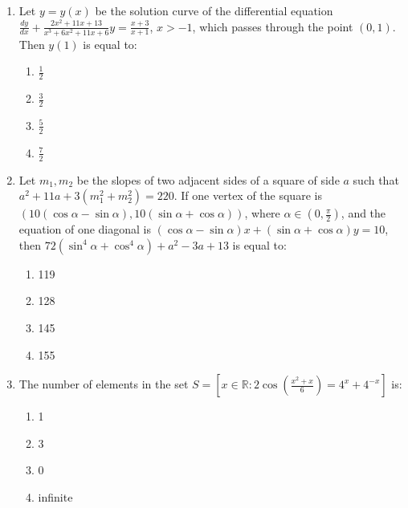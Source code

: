 \documentclass[journal]{IEEEtran}
\newcommand{\brak}[1]{\left( #1 \right)}
\newcommand{\sbrak}[1]{\left[ #1 \right]}
\newcommand{\gt}{>}
\begin{document}
\begin{enumerate}
    \item Let $y=y\brak{x}$ be the solution curve of the differential equation $\frac{dy}{dx}+\frac{2x^{2}+11x+13}{x^{3}+6x^{2}+11x+6}y=\frac{x+3}{x+1}$, $x\gt-1$, which passes through the point $\brak{0,1}$. Then $y\brak{1}$ is equal to:

        \begin{multicols}{4}
        \begin{enumerate}
        \item $\frac{1}{2}$
        \item $\frac{3}{2}$
        \item $\frac{5}{2}$
        \item $\frac{7}{2}$
        \end{enumerate}
        \end{multicols}

    \item Let $m_{1}, m_{2}$ be the slopes of two adjacent sides of a square of side $a$ such that $a^{2}+11a+3\brak{m_{1}^{2}+m_{2}^{2}}=220$. If one vertex of the square is $\brak{10\brak{\cos{\alpha}-\sin{\alpha}}, 10\brak{\sin{\alpha}+\cos{\alpha}}}$, where $\alpha\in\brak{0,\frac{\pi}{2}}$, and the equation of one diagonal is $\brak{\cos{\alpha}-\sin{\alpha}}x+\brak{\sin{\alpha}+\cos{\alpha}}y=10$, then $72\brak{\sin^{4}{\alpha}+\cos^{4}{\alpha}}+a^{2}-3a+13$ is equal to:

        \begin{multicols}{4}
        \begin{enumerate}
        \item 119
        \item 128
        \item 145
        \item 155
        \end{enumerate}
        \end{multicols}

    \item The number of elements in the set $S=\sbrak{x\in\mathbb{R}:2\cos\brak{\frac{x^{2}+x}{6}}=4^{x}+4^{-x}}$ is:

        \begin{multicols}{4}
        \begin{enumerate}
        \item 1
        \item 3
        \item 0
        \item infinite
        \end{enumerate}
        \end{multicols}


\end{enumerate}
\end{document}
